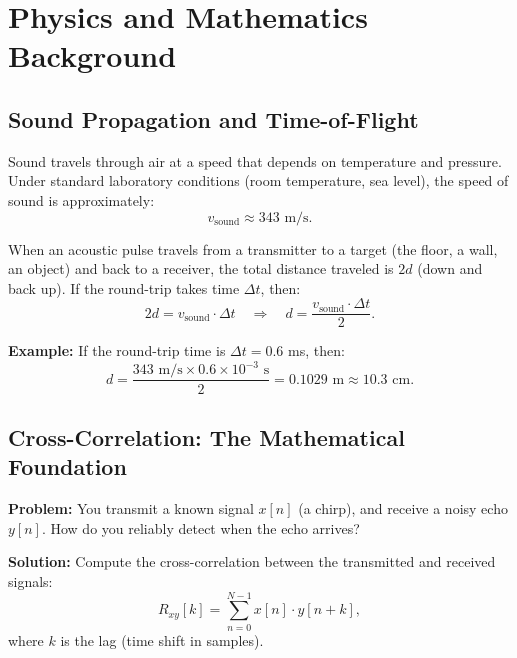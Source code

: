 \documentclass[11pt,letterpaper]{article}
\begin{document}
\section{Physics and Mathematics Background}

\subsection{Sound Propagation and Time-of-Flight}

Sound travels through air at a speed that depends on temperature and pressure. Under standard laboratory conditions (room temperature, sea level), the speed of sound is approximately:
\begin{equation}
v_{\text{sound}} \approx 343 \text{ m/s}.
\end{equation}

When an acoustic pulse travels from a transmitter to a target (the floor, a wall, an object) and back to a receiver, the total distance traveled is $2d$ (down and back up). If the round-trip takes time $\Delta t$, then:
\begin{equation}
2d = v_{\text{sound}} \cdot \Delta t \quad \Rightarrow \quad d = \frac{v_{\text{sound}} \cdot \Delta t}{2}.
\label{eq:tof}
\end{equation}

\textbf{Example:} If the round-trip time is $\Delta t = 0.6$ ms, then:
\begin{equation}
d = \frac{343 \text{ m/s} \times 0.6 \times 10^{-3} \text{ s}}{2} = 0.1029 \text{ m} \approx 10.3 \text{ cm}.
\end{equation}

\subsection{Cross-Correlation: The Mathematical Foundation}

\textbf{Problem:} You transmit a known signal $x[n]$ (a chirp), and receive a noisy echo $y[n]$. How do you reliably detect when the echo arrives?

\textbf{Solution:} Compute the cross-correlation between the transmitted and received signals:
\begin{equation}
R_{xy}[k] = \sum_{n=0}^{N-1} x[n] \cdot y[n+k],
\label{eq:xcorr}
\end{equation}
where $k$ is the lag (time shift in samples).
\end{document}
